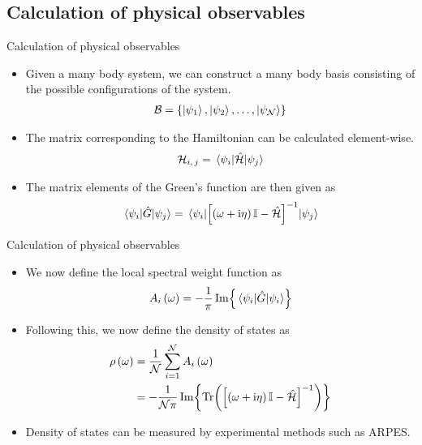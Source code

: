 \documentclass{beamer}
\newcommand{\I}{\mathrm{i}}
\newcommand{\ham}{\hat{\mathcal{H}}}
\begin{document}
\subsection{Calculation of physical observables}
	\begin{frame}{Calculation of physical observables}
		\begin{itemize}
		\item {
			Given a many body system, we can construct a many body basis consisting of the possible configurations of the system.
			\begin{align}
			\mathcal{B} = \{ \ket{\psi_1}, \ket{\psi_2}, \dots, \ket{\psi_{\mathcal{N}}} \}
			\end{align} 
			}
		\item {\pause
			The matrix corresponding to the Hamiltonian can be calculated element-wise.
			\begin{align}
				\mathcal{H}_{i,\,j} = \mel{\psi_i}{\ham}{\psi_j}
			\end{align}
			}
		\item {\pause
			The matrix elements of the Green's function are then given as
			 \begin{align}
			 \mel{\psi_i}{\hat{G}}{\psi_j} = \mel{\psi_i}{\left[ \left( \omega + \I \eta\right) \mathbb{I} - \ham \right]^{-1}}{\psi_j}
			 \end{align}
			}
	\end{itemize}
	\end{frame}
	
	\begin{frame}{Calculation of physical observables}
		\begin{itemize}
			\item {
				We now define the local spectral weight function as
				\begin{align}
				A_{i} \left( \omega \right) = -\frac{1}{\pi} \Im{ {\mel{\psi_i}{\hat{G}}{\psi_i}} }
				\end{align}
				}
			\item {\pause
				Following this, we now define the density of states as
				\begin{align}\label{eqn:dossum}
				\nonumber\rho \left( \omega \right) &= \frac{1}{\mathcal{N}} \sum_{i = 1}^{\mathcal{N}} A_{i} \left( \omega \right)\\
				&= -\frac{1}{\mathcal{N \pi}} \Im{ \Tr( \left[ \left( \omega + \I \eta\right) \mathbb{I} - \ham \right]^{-1} ) }
				\end{align}
				}
			\item {
				Density of states can be measured by experimental methods such as ARPES.
				}
		\end{itemize}
	\end{frame}
	
\end{document}
